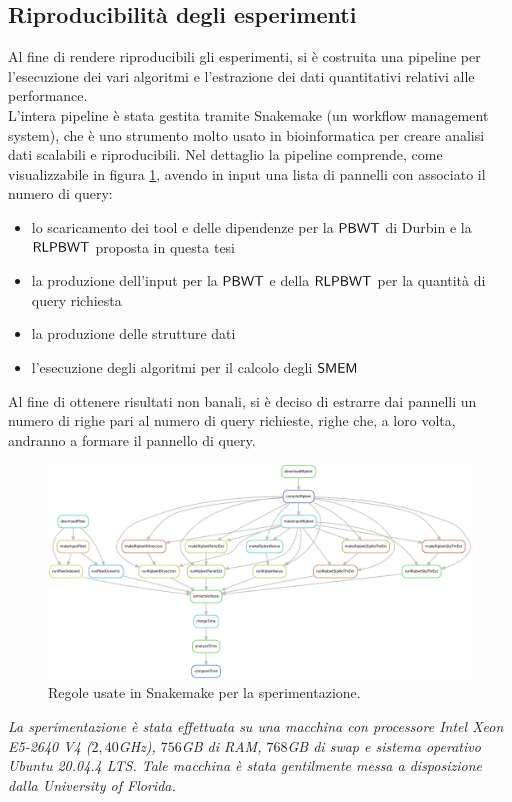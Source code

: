 \subsection{Riproducibilità degli esperimenti}
Al fine di rendere riproducibili gli esperimenti, si è costruita una pipeline
per l'esecuzione dei vari algoritmi e l'estrazione dei dati quantitativi
relativi alle performance.\\
L'intera pipeline è stata gestita tramite Snakemake \cite{snakemake}
(un workflow management system), che è uno strumento molto usato in
bioinformatica per creare analisi dati scalabili e riproducibili. Nel
dettaglio la pipeline comprende, come visualizzabile in figura \ref{fig:snake},
avendo in input una lista di pannelli con associato il numero di query:
\begin{itemize}
  \item lo scaricamento dei tool e delle dipendenze per la $\mbox{\rm {\sf PBWT}}$ di
  Durbin e la $\mbox{\rm {\sf RLPBWT}}$ proposta in questa tesi
  \item la produzione dell'input per la $\mbox{\rm {\sf PBWT}}$ e della $\mbox{\rm {\sf RLPBWT}}$ per
  la quantità di query richiesta
  \item la produzione delle strutture dati
  \item l'esecuzione degli algoritmi per il calcolo degli $\mbox{\rm {\sf SMEM}}$
\end{itemize}
Al fine di ottenere risultati non banali, si è deciso di estrarre dai pannelli
un numero di
righe pari al numero di 
query richieste, righe che, a loro volta, andranno a formare il pannello di
query.\\
\begin{figure}
  \centering
  \includegraphics[width=\textwidth]{img/rules.pdf}
  \caption{Regole usate in Snakemake per la sperimentazione.}
  \label{fig:snake}
\end{figure}
\newline
\textit{La sperimentazione è stata effettuata su una macchina con processore
  Intel Xeon E5-2640 V4 ($2,40$GHz), $756$GB di RAM, $768$GB di swap e
  sistema operativo Ubuntu 20.04.4 LTS. Tale macchina è stata gentilmente messa
  a disposizione dalla \emph{University of Florida}.}